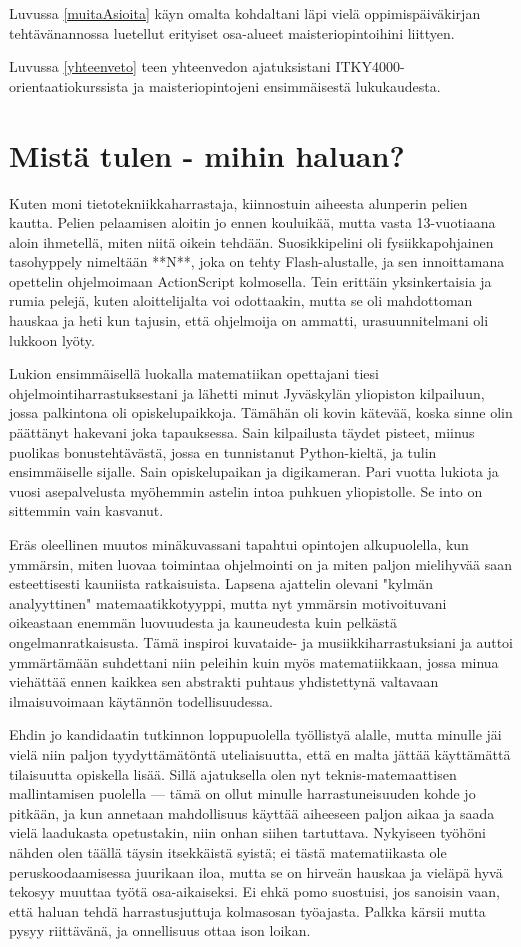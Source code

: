 \documentclass[utf8]{gradu3}
\begin{document}
Luvussa \ref{muitaAsioita} käyn omalta kohdaltani läpi vielä
oppimispäiväkirjan tehtävänannossa luetellut erityiset osa-alueet
maisteriopintoihini liittyen.

Luvussa \ref{yhteenveto} teen yhteenvedon ajatuksistani
ITKY4000-orientaatiokurssista ja maisteriopintojeni ensimmäisestä
lukukaudesta.

\chapter{Mistä tulen - mihin haluan?}
\label{taustatJaTavoitteet}

Kuten moni tietotekniikkaharrastaja, kiinnostuin aiheesta alunperin pelien
kautta. Pelien pelaamisen aloitin jo ennen kouluikää, mutta vasta
13-vuotiaana aloin ihmetellä, miten niitä oikein tehdään. Suosikkipelini oli
fysiikka\-pohjainen tasohyppely nimeltään **N**, joka on tehty
Flash-alustalle, ja sen innoittamana opettelin ohjelmoimaan ActionScript
kolmosella. Tein erittäin yksinkertaisia ja rumia pelejä, kuten
aloittelijalta voi odottaakin, mutta se oli mahdottoman hauskaa ja heti kun
tajusin, että ohjelmoija on ammatti, urasuunnitelmani oli lukkoon lyöty.

Lukion ensimmäisellä luokalla matematiikan opettajani tiesi
ohjelmointiharrastuksestani ja lähetti minut Jyväskylän yliopiston
kilpailuun, jossa palkintona oli opiskelupaikkoja. Tämähän oli kovin kätevää,
koska sinne olin päättänyt hakevani joka tapauksessa. Sain kilpailusta täydet
pisteet, miinus puolikas bonustehtävästä, jossa en tunnistanut Python-kieltä,
ja tulin ensimmäiselle sijalle. Sain opiskelupaikan ja digikameran. Pari
vuotta lukiota ja vuosi asepalvelusta myöhemmin astelin intoa puhkuen
yliopistolle. Se into on sittemmin vain kasvanut.

Eräs oleellinen muutos minäkuvassani tapahtui opintojen alkupuolella, kun
ymmärsin, miten luovaa toimintaa ohjelmointi on ja miten paljon mielihyvää
saan esteettisesti kauniista ratkaisuista. Lapsena ajattelin olevani "kylmän
analyyttinen" matemaatikkotyyppi, mutta nyt ymmärsin motivoituvani oikeastaan
enemmän luovuudesta ja kauneudesta kuin pelkästä ongelmanratkaisusta. Tämä
inspiroi kuvataide- ja musiikkiharrastuksiani ja auttoi ymmärtämään
suhdettani niin peleihin kuin myös matematiikkaan, jossa minua viehättää
ennen kaikkea sen abstrakti puhtaus yhdistettynä valtavaan ilmaisuvoimaan
käytännön todellisuudessa.

Ehdin jo kandidaatin tutkinnon loppupuolella työllistyä alalle, mutta minulle
jäi vielä niin paljon tyydyttämätöntä uteliaisuutta, että en malta jättää
käyttämättä tilaisuutta opiskella lisää. Sillä ajatuksella olen nyt
teknis-matemaattisen mallintamisen puolella — tämä on ollut minulle
harrastuneisuuden kohde jo pitkään, ja kun annetaan mahdollisuus käyttää
aiheeseen paljon aikaa ja saada vielä laadukasta opetustakin, niin onhan
sii\-hen tartuttava. Nykyiseen työhöni nähden olen täällä täysin itsekkäistä
syistä; ei tästä matematiikasta ole peruskoodaamisessa juurikaan iloa, mutta
se on hirveän hauskaa ja vieläpä hyvä tekosyy muuttaa työtä osa-aikaiseksi.
Ei ehkä pomo suostuisi, jos sanoisin vaan, että haluan tehdä harrastusjuttuja
kolmasosan työajasta. Palkka kärsii mutta pysyy riittävänä, ja onnellisuus
ottaa ison loikan.
\end{document}
